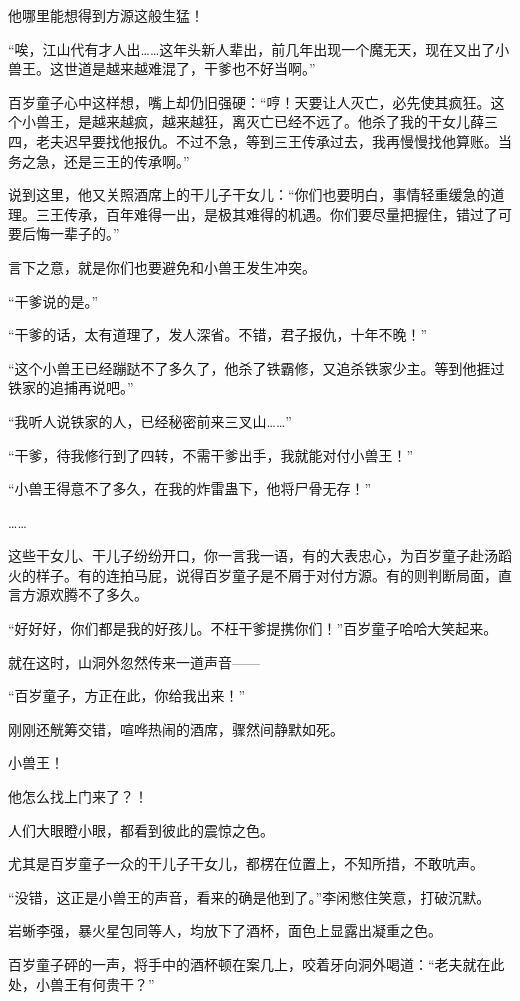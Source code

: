\begin{this_body}
他哪里能想得到方源这般生猛！

“唉，江山代有才人出……这年头新人辈出，前几年出现一个魔无天，现在又出了小兽王。这世道是越来越难混了，干爹也不好当啊。”

百岁童子心中这样想，嘴上却仍旧强硬：“哼！天要让人灭亡，必先使其疯狂。这个小兽王，是越来越疯，越来越狂，离灭亡已经不远了。他杀了我的干女儿薛三四，老夫迟早要找他报仇。不过不急，等到三王传承过去，我再慢慢找他算账。当务之急，还是三王的传承啊。”

说到这里，他又关照酒席上的干儿子干女儿：“你们也要明白，事情轻重缓急的道理。三王传承，百年难得一出，是极其难得的机遇。你们要尽量把握住，错过了可要后悔一辈子的。”

言下之意，就是你们也要避免和小兽王发生冲突。

“干爹说的是。”

“干爹的话，太有道理了，发人深省。不错，君子报仇，十年不晚！”

“这个小兽王已经蹦跶不了多久了，他杀了铁霸修，又追杀铁家少主。等到他捱过铁家的追捕再说吧。”

“我听人说铁家的人，已经秘密前来三叉山……”

“干爹，待我修行到了四转，不需干爹出手，我就能对付小兽王！”

“小兽王得意不了多久，在我的炸雷蛊下，他将尸骨无存！”

……

这些干女儿、干儿子纷纷开口，你一言我一语，有的大表忠心，为百岁童子赴汤蹈火的样子。有的连拍马屁，说得百岁童子是不屑于对付方源。有的则判断局面，直言方源欢腾不了多久。

“好好好，你们都是我的好孩儿。不枉干爹提携你们！”百岁童子哈哈大笑起来。

就在这时，山洞外忽然传来一道声音——

“百岁童子，方正在此，你给我出来！”

刚刚还觥筹交错，喧哗热闹的酒席，骤然间静默如死。

小兽王！

他怎么找上门来了？！

人们大眼瞪小眼，都看到彼此的震惊之色。

尤其是百岁童子一众的干儿子干女儿，都楞在位置上，不知所措，不敢吭声。

“没错，这正是小兽王的声音，看来的确是他到了。”李闲憋住笑意，打破沉默。

岩蜥李强，暴火星包同等人，均放下了酒杯，面色上显露出凝重之色。

百岁童子砰的一声，将手中的酒杯顿在案几上，咬着牙向洞外喝道：“老夫就在此处，小兽王有何贵干？”


\end{this_body}
